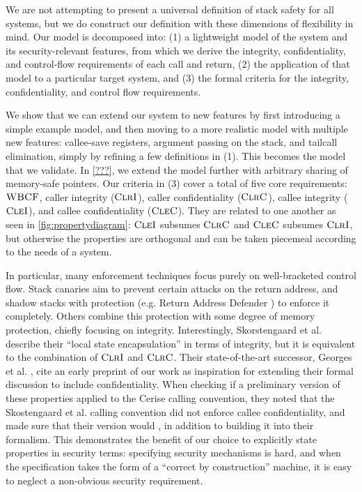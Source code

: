 \documentclass[10pt,conference]{ieeetran}%
\theoremstyle{definition}
\begin{document}
We are not attempting to present a universal definition of stack safety for all systems,
but we do construct our definition with these dimensions of flexibility in mind.
Our model is decomposed into:
(1) a lightweight model of the system and its security-relevant features, from which we
derive the integrity, confidentiality, and control-flow requirements of each call and
return, (2) the application of that model to a particular target system, and (3)
the formal criteria for the integrity, confidentiality, and control flow
requirements.

We show that we can extend our system to new features by first introducing a simple
example model, and then moving to a more realistic model with multiple new features:
callee-save registers, argument passing on the stack, and tailcall elimination, simply
by refining a few definitions in (1). This becomes the model that we validate.
In \cref{???}, we extend the model further with arbitrary sharing of memory-safe
pointers. Our criteria in (3) cover a total of five core requirements:
\(\textnormal{\sc WBCF}\), caller integrity (\(\textnormal{\sc ClrI}\)), caller confidentiality (\(\textnormal{\sc ClrC}\)),
callee integrity (\(\textnormal{\sc CleI}\)), and callee confidentiality (\(\textnormal{\sc CleC}\)).
They are related to one another as seen in
\cref{fig:propertydiagram}: \(\textnormal{\sc CleI}\) subsumes \(\textnormal{\sc ClrC}\) and \(\textnormal{\sc CleC}\) subsumes
\(\textnormal{\sc ClrI}\), but otherwise the properties are orthogonal and can be taken piecemeal
according to the needs of a system.

In particular, many enforcement techniques focus purely on
well-bracketed control flow. Stack canaries aim to prevent certain attacks on the return
address, and shadow stacks with protection (e.g. Return Address Defender \cite{Chiueh2001RAD})
to enforce it completely. Others combine this protection with some degree of memory protection,
chiefly focusing on integrity. Interestingly, Skorstengaard et al. \cite{SkorstengaardSTKJFP}
describe their ``local state encapsulation'' in terms of integrity, but it is equivalent
to the combination of \(\textnormal{\sc ClrI}\) and \(\textnormal{\sc ClrC}\). Their state-of-the-art successor,
Georges et al. \cite{Georges22:TempsDesCerises}, cite an early preprint of our work
as inspiration for extending their formal discussion to include confidentiality.
When checking if a preliminary version of these properties applied to
the Cerise calling convention, they noted that the Skostengaard et al. calling convention
did not enforce callee confidentiality, and made sure that their version would
\cite{Georges22:personalcommunication}, in addition to building it into their formalism.
This demonstrates the benefit of our choice to explicitly state properties in security
terms: specifying security mechanisms is hard, and when the specification takes the
form of a ``correct by construction'' machine, it is easy to neglect a non-obvious
security requirement.
\end{document}
